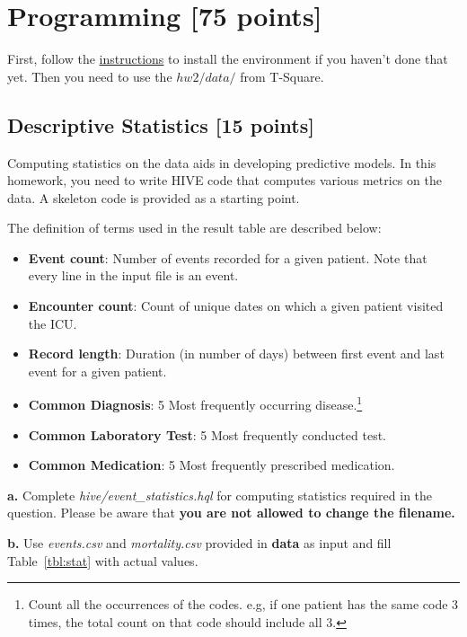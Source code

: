 \documentclass[12pt]{article}
\begin{document}
\newpage
\section{Programming [75 points]}
First, follow the \href{http://www.sunlab.org/teaching/cse8803/lab/environment/}{instructions} to install the environment if you haven't done that yet. Then you need to use the $hw2/data/$ from T-Square. 

\subsection{Descriptive Statistics [15 points]}
Computing statistics on the data aids in developing predictive models. In this homework, you need to write HIVE code that computes various metrics on the data. A skeleton code is provided as a starting point.

The definition of terms used in the result table are described below:
\begin{itemize}
\item \textbf{Event count}: Number of events recorded for a given patient. Note that every line in the input file is an event. 
\item \textbf{Encounter count}: Count of unique dates on which a given patient visited the ICU.
\item \textbf{Record length}: Duration (in number of days) between first event and last event for a given patient.
\item \textbf{Common Diagnosis}: 5 Most frequently occurring disease.\footnote{Count all the occurrences of the codes. e.g, if one patient has the same code 3 times, the total count on that code should include all 3. }
\item \textbf{Common Laboratory Test}: 5 Most frequently conducted test.
\item \textbf{Common Medication}: 5 Most frequently prescribed medication.
\end{itemize}

\textbf{a.} Complete \textit{hive/event\_statistics.hql} for computing statistics required in the question. Please be aware that \textbf{\color{red} you are not allowed to change the filename.} 

\textbf{b.} Use \textit{events.csv} and \textit{mortality.csv} provided in \textbf{data} as input and fill Table~\ref{tbl:stat} with actual values. \\
\end{document}
